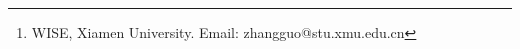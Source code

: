 \documentclass{article}
\title{}
\author{
Guo Zhang
\footnote{WISE, Xiamen University. Email: zhangguo@stu.xmu.edu.cn}
}
\date{This Version: \today}
\begin{document}
\maketitle

\section{}



% 

\end{document}
